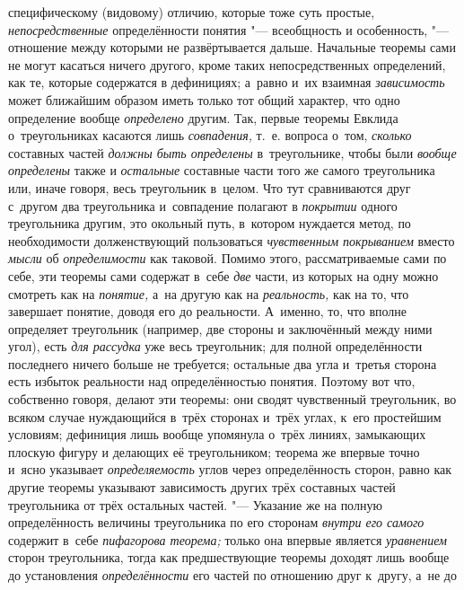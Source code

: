 специфическому (видовому) отличию, которые тоже суть простые,
{\em непосредственные}
определённости понятия "--- всеобщность и
особенность, "--- отношение между которыми не развёртывается
дальше. Начальные теоремы сами не могут касаться ничего другого, кроме
таких непосредственных определений, как те, которые содержатся в
дефинициях; а~равно и~их взаимная
{\em зависимость} может
ближайшим образом иметь только тот общий характер, что одно определение
вообще {\em определено}
другим. Так, первые теоремы Евклида о~треугольниках касаются
лишь {\em совпадения,}
т.~е. вопроса о~том,
{\em сколько} составных
частей {\em должны быть определены}
в~треугольнике, чтобы были
{\em вообще определены}
также и {\em остальные}
составные части того же самого треугольника или, иначе
говоря, весь треугольник в~целом. Что тут сравниваются друг с~другом два
треугольника и~совпадение полагают в
{\em покрытии} одного
треугольника другим, это окольный путь, в~котором нуждается метод, по
необходимости долженствующий пользоваться
{\em чувственным покрыванием}
вместо {\em мысли}
об {\em определимости}
как таковой. Помимо этого, рассматриваемые сами по себе, эти
теоремы сами содержат в~себе {\em две}
части, из которых на одну можно смотреть как на
{\em понятие,} а~на
другую как на {\em реальность,}
как на то, что завершает понятие, доводя его до реальности.
А~именно, то, что вполне определяет треугольник (например, две стороны и
заключённый между ними угол), есть
{\em для рассудка} уже
весь треугольник; для полной определённости последнего ничего больше не
требуется; остальные два угла и~третья сторона есть избыток реальности над
определённостью понятия. Поэтому вот что, собственно говоря,
делают эти теоремы: они сводят чувственный треугольник, во всяком случае
нуждающийся в~трёх сторонах и~трёх углах, к~его простейшим условиям;
дефиниция лишь вообще упомянула о~трёх линиях, замыкающих плоскую фигуру и
делающих её треугольником; теорема же впервые точно и~ясно указывает
{\em определяемость}
углов через определённость сторон, равно как другие теоремы
указывают зависимость других трёх составных частей треугольника от трёх
остальных частей. "--- Указание же на полную определённость
величины треугольника по его сторонам
{\em внутри его самого}
содержит в~себе
{\em пифагорова теорема;}
только она впервые является
{\em уравнением} сторон
треугольника, тогда как предшествующие
теоремы
доходят лишь вообще до установления
{\em определённости} его
частей по отношению друг к~другу, а~не до

